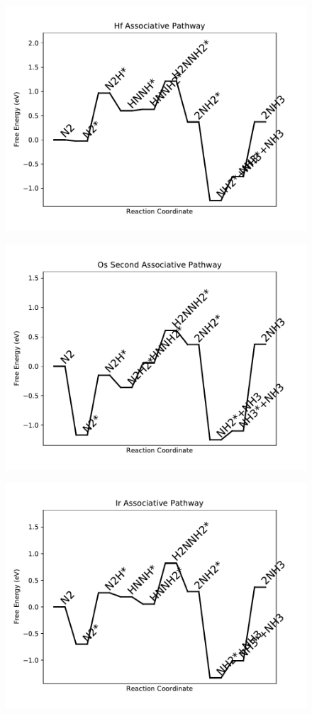 \begin{figure}
\centering
\includegraphics[width=0.8\linewidth]{data/plots/Hf_associative.pdf}
\end{figure}

\begin{figure}
\centering
\includegraphics[width=0.8\linewidth]{data/plots/Os_associative_2.pdf}
\end{figure}

\begin{figure}
\centering
\includegraphics[width=0.8\linewidth]{data/plots/Ir_associative.pdf}
\end{figure}

